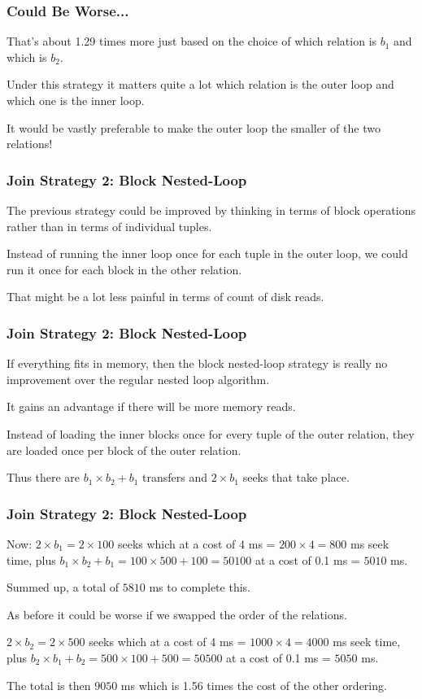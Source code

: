 \begin{frame}
\frametitle{Could Be Worse...}
 That's about 1.29 times more just based on the choice of which relation is $b_{1}$ and which is $b_{2}$.
 
 Under this strategy it matters quite a lot which relation is the outer loop and which one is the inner loop. 
 
 It would be vastly preferable to make the outer loop the smaller of the two relations!

\end{frame}

\begin{frame}
\frametitle{Join Strategy 2: Block Nested-Loop}

The previous strategy could be improved by thinking in terms of block operations rather than in terms of individual tuples. 

Instead of running the inner loop once for each tuple in the outer loop, we could run it once for each block in the other relation. 

That might be a lot less painful in terms of count of disk reads. 

\end{frame}

\begin{frame}
\frametitle{Join Strategy 2: Block Nested-Loop}

If everything fits in memory, then the block nested-loop strategy is really no improvement over the regular nested loop algorithm. 

It gains an advantage if there will be more memory reads. 

Instead of loading the inner blocks once for every tuple of the outer relation, they are loaded once per block of the outer relation.

Thus there are $b_{1} \times b_{2} + b_{1}$ transfers and $2\times b_{1}$ seeks that take place.

\end{frame}

\begin{frame}
\frametitle{Join Strategy 2: Block Nested-Loop}

Now: $2 \times b_{1} = 2 \times 100 $ seeks which at a cost of 4 ms = $200 \times 4 = 800$ ms seek time, plus $b_{1} \times b_{2} + b_{1} = 100 \times 500 + 100 = 50100$ at a cost of 0.1 ms = $5010$ ms. 

Summed up, a total of $5810$ ms to complete this.

As before it could be worse if we swapped the order of the relations. 

$2 \times b_{2} = 2 \times 500 $ seeks which at a cost of 4 ms = $1000 \times 4 = 4000$ ms seek time, plus $b_{2} \times b_{1} + b_{2} = 500 \times 100 + 500 = 50500$ at a cost of 0.1 ms = $5050$ ms. 

The total is then $9050$ ms which is 1.56 times the cost of the other ordering.

\end{frame}

